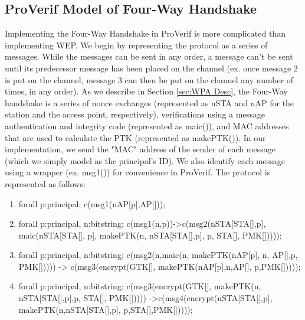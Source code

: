 \documentclass[11pt, twocolumn]{article} %
\begin{document}
{\subsection{ProVerif Model of Four-Way Handshake}
Implementing the Four-Way Handshake in ProVerif is more complicated than implementing WEP.  We begin by representing the protocol as a series of messages.  While the messages can be sent in any order, a message can't be sent until its predecessor message has been placed on the channel (ex. once message 2 is put on the channel, message 3 can then be put on the channel any number of times, in any order). As we describe in Section \ref{sec:WPA Desc}, the Four-Way handshake is a series of nonce exchanges (represented as nSTA and nAP for the station and the access point, respectively), verifications using a message authentication and integrity code (represented as maic()), and MAC addresses that are used to calculate the PTK (represented as makePTK()).  In our implementation, we send the "MAC" address of the sender of each message (which we simply model as the principal's ID).  We also identify each message using a wrapper (ex. msg1()) for convenience in ProVerif.  The protocol is represented as follows:
\begin{enumerate}[leftmargin=4mm]
\item
\begin{verbatimtab}[2]
forall p:principal; c(msg1(nAP[p],AP[]));
\end{verbatimtab}
\item
\begin{verbatimtab}[2]
forall p:principal, n:bitstring; 
	c(msg1(n,p))->c(msg2(nSTA[STA[],p], 
		maic(nSTA[STA[], p], 
			makePTK(n, nSTA[STA[],p],
				p, STA[], PMK[]))));
\end{verbatimtab}
\item
\begin{verbatimtab}[2]
forall p:principal, n:bitstring; 
	c(msg2(n,maic(n, makePTK(nAP[p],
		n, AP[],p, PMK[])))) -> 
			c(msg3(encrypt(GTK[], 
				makePTK(nAP[p],n,AP[],
					p,PMK[]))));
\end{verbatimtab}
\item
\begin{verbatimtab}[2]
forall p:principal, n:bitstring; 
	c(msg3(encrypt(GTK[], makePTK(n,
		nSTA[STA[],p],p, STA[], PMK[])))) 
			->c(msg4(encrypt(nSTA[STA[],p],
					makePTK(n,nSTA[STA[],p],
						p,STA[],PMK[]))));
\end{verbatimtab}
\end{enumerate}

}
\end{document}
